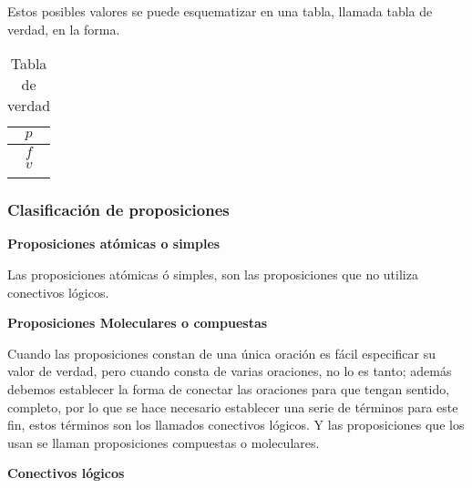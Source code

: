 Estos posibles valores se puede esquematizar en una tabla, llamada
tabla de verdad, en la forma. 

\begin{table}[H]
\centering

\caption{Tabla de verdad}

\begin{tabular}{c}
\tabularnewline[6ex]\arrayrulecolor{ptctitle}\hline\cellcolor{gray!50}$p$\tabularnewline
\hline\cellcolor{ptcbackground}$f$\tabularnewline
\hline\cellcolor{ptcbackground}$v$\tabularnewline\arrayrulecolor{ptctitle}\hline\tabularnewline
\end{tabular}
\end{table}


\subsubsection{Clasificación de proposiciones}

\hspace*{1pt}\textbf{Proposiciones atómicas o simples}

Las proposiciones atómicas ó simples, son las proposiciones que no
utiliza conectivos lógicos.

\textbf{Proposiciones Moleculares o compuestas}

Cuando las proposiciones constan de una única oración es fácil especificar
su valor de verdad, pero cuando consta de varias oraciones, no lo
es tanto; además debemos establecer la forma de conectar las oraciones
para que tengan sentido, completo, por lo que se hace necesario establecer
una serie de términos para este fin, estos términos son los llamados
conectivos lógicos. Y las proposiciones que los usan se llaman proposiciones
compuestas o moleculares.

\textsf{\textbf{Conectivos lógicos}}

